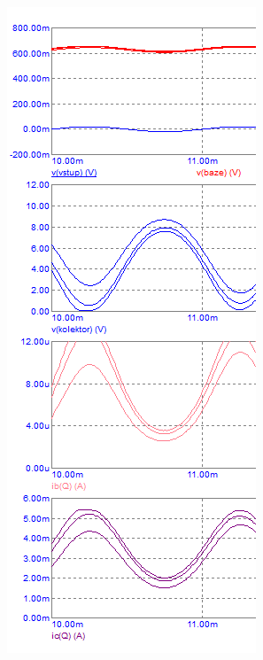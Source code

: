 \documentclass{article}
\begin{document}
\begin{figure}[H]
\begin{minipage}[t]{0.33\textwidth}
  \end{minipage}
  \hfill
  \begin{minipage}[t]{0.25\textwidth}
    \begin{figure}[H]
      \includegraphics[width=\textwidth]{PC/BJT/Tranzient_analyza_4.png}

\end{figure}
\end{minipage}
\end{figure}
\end{document}
